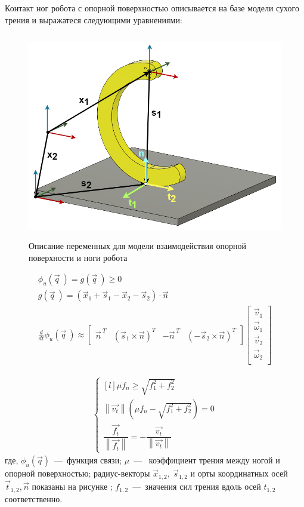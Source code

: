 Контакт ног робота с опорной поверхностью  описывается на базе модели сухого трения и выражатеся следующими уравнениями:

\begin{figure}[H]
    \centering\includegraphics[height=9cm,width=1\textwidth,keepaspectratio]{images/contact_interaction.png}
    \caption{Описание переменных для модели взаимодействия опорной поверхности и ноги робота}
    \label{fig:contact_interaction.png}
\end{figure}

\begin{align}
    \label{eq:contact_inter}
    \phi_u(\vec{q}\ ) = g(\vec{q}\ ) \geqslant 0 \\ 
    g(\vec{q}\ ) = (\vec{x}_1 + \vec{s}_1 - \vec{x}_2 - \vec{s}_2) \cdot \vec{n} \\
    \frac{d }{d t}\phi_u(\vec{q}\ ) \approx \begin{bmatrix}
        \vec{n}^{\ T} & (\vec{s}_1 \times \vec{n})^T & -\vec{n}^{\ T} & (-\vec{s}_2 \times \vec{n})^T
    \end{bmatrix} \begin{bmatrix}
        \vec{v}_1\\ 
    \vec{\omega}_1\\ 
    \vec{v}_2\\
    \vec{\omega}_2\\
    \end{bmatrix}
\end{align} 

\begin{align}
    \label{eq:ground_inter}
\left\{\begin{matrix*}[l]
\mu f_n \geqslant \sqrt{f_1^2 + f_2^2}\\ 
\left\lVert \vec{v_t}\right\rVert (\mu f_n - \sqrt{f_1^2 + f_2^2}) = 0\\
\dfrac{\vec{f_t}}{\left\lVert \vec{f_t}\right\rVert } = - \dfrac{\vec{v_t}}{\left\lVert \vec{v_t}\right\rVert }
\end{matrix*}\right.
\end{align}
где, $\phi_u(\vec{q})$~---~функция связи; $ \mu $~---~ коэффициент трения между ногой и опорной поверхностью;  радиус-векторы $\vec{x}_{1,2},\ \vec{s}_{1,2}$ и орты координатных осей $\vec{t}_{1,2}, \vec{n}$ показаны на рисунке ; $ f_{1,2} $~---~значения сил трения вдоль осей $t_{1,2}$ соответственно.

